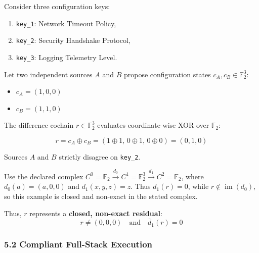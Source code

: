 \documentclass[
  10pt,
]{article}
\begin{document}
Consider three configuration keys:

\begin{enumerate}
\def\labelenumi{\arabic{enumi}.}
\item
  \texttt{key\_1}: Network Timeout Policy,
\item
  \texttt{key\_2}: Security Handshake Protocol,
\item
  \texttt{key\_3}: Logging Telemetry Level.
\end{enumerate}

Let two independent sources \hypertarget{math-E0038-0041}{}{\(A\)} and \hypertarget{math-E0039-0042}{}{\(B\)} propose configuration states \hypertarget{math-E0040-0043}{}{\(c_A, c_B \in \mathbb{F}_2^3\)}:

\begin{itemize}
\item
  \hypertarget{math-E0041-0044}{}{\(c_A = (1, 0, 0)\)}
\item
  \hypertarget{math-E0042-0045}{}{\(c_B = (1, 1, 0)\)}
\end{itemize}

The difference cochain \hypertarget{math-E0043-0046}{}{\(r \in \mathbb{F}_2^3\)} evaluates coordinate-wise XOR over \hypertarget{math-E0044-0047}{}{\(\mathbb{F}_2\)}:

\hypertarget{math-E0045-0048}{}{\[r = c_A \oplus c_B = (1 \oplus 1,\, 0 \oplus 1,\, 0 \oplus 0) = (0, 1, 0)\]}

Sources \hypertarget{math-E0038-0049}{}{\(A\)} and \hypertarget{math-E0039-0050}{}{\(B\)} strictly disagree on \texttt{key\_2}.

Use the declared complex \hypertarget{math-E0046-0051}{}{\(C^0=\mathbb F_2 \xrightarrow{d_0} C^1=\mathbb F_2^3 \xrightarrow{d_1} C^2=\mathbb F_2\)}, where \hypertarget{math-E0047-0052}{}{\(d_0(a)=(a,0,0)\)} and \hypertarget{math-E0048-0053}{}{\(d_1(x,y,z)=z\)}. Thus \hypertarget{math-E0049-0054}{}{\(d_1(r)=0\)}, while \hypertarget{math-E0050-0055}{}{\(r\notin\operatorname{im}(d_0)\)}, so this example is closed and non-exact in the stated complex.

Thus, \hypertarget{math-E0019-0056}{}{\(r\)} represents a \textbf{closed, non-exact residual}: \hypertarget{math-E0051-0057}{}{\[r \neq (0, 0, 0) \quad \text{and} \quad \bar{d}_1(r) = 0\]}

\subsubsection{5.2 Compliant Full-Stack Execution}\label{compliant-full-stack-execution}
\end{document}
